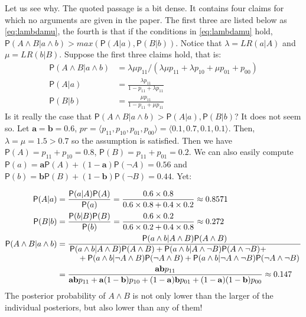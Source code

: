 \documentclass[10pt,dvipsnames,enabledeprecatedfontcommands]{scrartcl}
\newcommand{\ra}{\rangle}
\newcommand{\la}{\langle}
\newcommand{\n}{\neg}
\newcommand{\et}{\wedge}
\newcommand{\pr}[1]{\mathsf{P}(#1)}
\begin{document}
Let us see why. The quoted passage is a bit dense. It contains four
claims for which no arguments are given in the paper. The first three
are listed below as \eqref{eq:lambdamu}, the fourth is that if the
conditions in \eqref{eq:lambdamu} hold,
\(\pr{A\et B\vert a\et b}>max(\pr{A\vert a},\pr{B\vert b})\). Notice
that \(\lambda=LR(a\vert A)\) and \(\mu=LR(b\vert B)\). Suppose the
first three claims hold, that is: \begin{align}\label{eq:lambdamu}
 \pr{A\et B\vert  a\et b} &= \lambda \mu p_{11}/(\lambda \mu p_{11} + \lambda p_{10} +\mu p_{01} + p_{00})\\
 \pr{A\vert a} & = \frac{\lambda p_{11}}{1-p_{11}+\lambda p_{11}}\nonumber \\
 \pr{B\vert b} & = \frac{\mu p_{11}}{1-p_{11}+\mu p_{11}} \nonumber 
 \end{align} \noindent Is it really the case that
\(\pr{A\et B\vert a\et b}>\pr{A\vert a},\pr{B\vert b}\)? It does not
seem so. Let \(\mathbf{a}=\mathbf{b}=0.6\),
\(pr =\la p_{11},p_{10},p_{01},p_{00}\ra=\la 0.1, 0.7, 0.1, 0.1 \ra\).
Then, \(\lambda=\mu=1.5>0.7\) so the assumption is satisfied. Then we
have \(\pr{A}=p_{11}+p_{10}=0.8\), \(\pr{B}=p_{11}+p_{01}=0.2\). We can
also easily compute
\(\pr{a}=\mathbf{a}\pr{A}+(1-\mathbf{a})\pr{\n A}=0.56\) and
\(\pr{b}=\mathbf{b}\pr{B}+(1-\mathbf{b})\pr{\n B}=0.44\). Yet:

\begin{align*}
 \pr{A\vert a} & = \frac{\pr{a\vert A}\pr{A}}{\pr{a}} = \frac{0.6\times 0.8}{0.6\times 0.8 + 0.4\times 0.2}\approx 0.8571 \\
 \pr{B\vert b} & = \frac{\pr{b\vert B}\pr{B}}{\pr{b}} = \frac{0.6\times 0.2}{0.6\times 0.2 + 0.4\times 0.8}\approx 0.272 \\
 \pr{A\et B \vert a \et b} & = \frac{\pr{a\et b\vert A \et B}\pr{A\et B}}{\splitfrac{\pr{a\et b \vert A\et B}\pr{A\et B}+
   \pr{a\et b\vert A\et \n B}\pr{A\et \n B} +}{+ 
 \pr{a\et b \vert \n A \et B}\pr{\n A \et B} + \pr{a\et b \vert \n A \et \n B}\pr{\n A \et \n B}}} \\
 & = \frac{\mathbf{ab}p_{11}}{
   \mathbf{ab}p_{11} + \mathbf{a}(1-\mathbf{b})p_{10} + (1-\mathbf{a})\mathbf{b}p_{01} + (1-\mathbf{a})(1-\mathbf{b})p_{00}
 }  
    \approx 0.147
 \end{align*} The posterior probability of \(A\et B\) is not only lower
than the larger of the individual posteriors, but also lower than any of
them!
\end{document}
